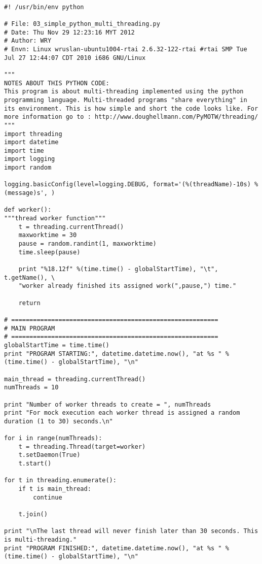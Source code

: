 \begin{lstlisting}[caption={App4-Python Parallel Multithreading Codes}, label=App4-Python Parallel Multithreading]

#! /usr/bin/env python

# File: 03_simple_python_multi_threading.py
# Date: Thu Nov 29 12:23:16 MYT 2012
# Author: WRY
# Envn: Linux wruslan-ubuntu1004-rtai 2.6.32-122-rtai #rtai SMP Tue Jul 27 12:44:07 CDT 2010 i686 GNU/Linux

"""
NOTES ABOUT THIS PYTHON CODE: 
This program is about multi-threading implemented using the python programming language. Multi-threaded programs "share everything" in its environment. This is how simple and short the code looks like. For more information go to : http://www.doughellmann.com/PyMOTW/threading/
"""
import threading
import datetime
import time
import logging
import random

logging.basicConfig(level=logging.DEBUG, format='(%(threadName)-10s) %(message)s', )

def worker():
"""thread worker function"""
	t = threading.currentThread()
	maxworktime = 30
	pause = random.randint(1, maxworktime)
	time.sleep(pause)
	
	print "%18.12f" %(time.time() - globalStartTime), "\t", t.getName(), \
	"worker already finished its assigned work(",pause,") time."
	
	return

# =========================================================
# MAIN PROGRAM
# =========================================================
globalStartTime = time.time() 
print "PROGRAM STARTING:", datetime.datetime.now(), "at %s " %(time.time() - globalStartTime), "\n"

main_thread = threading.currentThread()
numThreads = 10

print "Number of worker threads to create = ", numThreads
print "For mock execution each worker thread is assigned a random duration (1 to 30) seconds.\n"

for i in range(numThreads):
	t = threading.Thread(target=worker)
	t.setDaemon(True)
	t.start()

for t in threading.enumerate():
	if t is main_thread:
		continue

	t.join()

print "\nThe last thread will never finish later than 30 seconds. This is multi-threading." 
print "PROGRAM FINISHED:", datetime.datetime.now(), "at %s " %(time.time() - globalStartTime), "\n"


\end{lstlisting}
